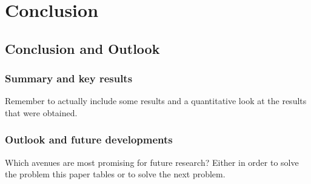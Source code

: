 \chapter{Conclusion} %

\section{Conclusion and Outlook}



\subsection{Summary and key results}

Remember to actually include some results and a quantitative look at the results that were obtained.

\subsection{Outlook and future developments}

Which avenues are most promising for future research?
Either in order to solve the problem this paper tables or to solve the next problem.
